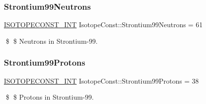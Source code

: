 \subsubsection{\texorpdfstring{Strontium99\+Neutrons}{Strontium99Neutrons}}
{\footnotesize\ttfamily \mbox{\hyperlink{group___isotope_const-_macros_ga5f18360b3e99483a35c32d789e62621c}{I\+S\+O\+T\+O\+P\+E\+C\+O\+N\+S\+T\+\_\+\+I\+NT}} Isotope\+Const\+::\+Strontium99\+Neutrons = 61}

\$ \$ Neutrons in Strontium-\/99. \mbox{\label{group___isotope_const-_strontium-_sr99_ga9696f289571fae75413a09143ca380c6}} 
\subsubsection{\texorpdfstring{Strontium99\+Protons}{Strontium99Protons}}
{\footnotesize\ttfamily \mbox{\hyperlink{group___isotope_const-_macros_ga5f18360b3e99483a35c32d789e62621c}{I\+S\+O\+T\+O\+P\+E\+C\+O\+N\+S\+T\+\_\+\+I\+NT}} Isotope\+Const\+::\+Strontium99\+Protons = 38}

\$ \$ Protons in Strontium-\/99. 